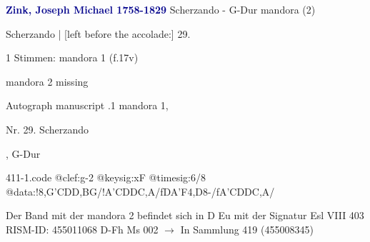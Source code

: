 \documentclass[twocolumn]{book}
\begin{document}
\newline \par \vspace{7pt} \textcolor{darkblue}{\textbf{Zink, Joseph Michael  1758-1829}}
\newline Scherzando - G-Dur
\newline mandora (2)
\newline \begin{itshape}[f.17v, at left:] Scherzando | [left before the accolade:] 29.\end{itshape} 
\newline \textcolor{darkblue}{}  1 Stimmen: mandora 1  (f.17v)
\newline \begin{small} mandora 2 missing\end{small} 
\newline Autograph manuscript
.1  mandora 1, \begin{itshape}Nr. 29. Scherzando\end{itshape}, G-Dur  
\begin{filecontents*}{411-1.code}
@clef:g-2
@keysig:xF
@timesig:6/8
@data:!8,G'CD{D,B}G/!A'CDDC,A/fDA'F4,D8-/fA'CDDC,A/
\end{filecontents*}
\newline
%
\newline Der Band mit der mandora 2 befindet sich in D Eu mit der Signatur Esl VIII 403
\newline RISM-ID: 455011068
\newline D-Fh  Ms 002
\newline $\rightarrow$ In Sammlung 419 (455008345)
      
\end{document}
